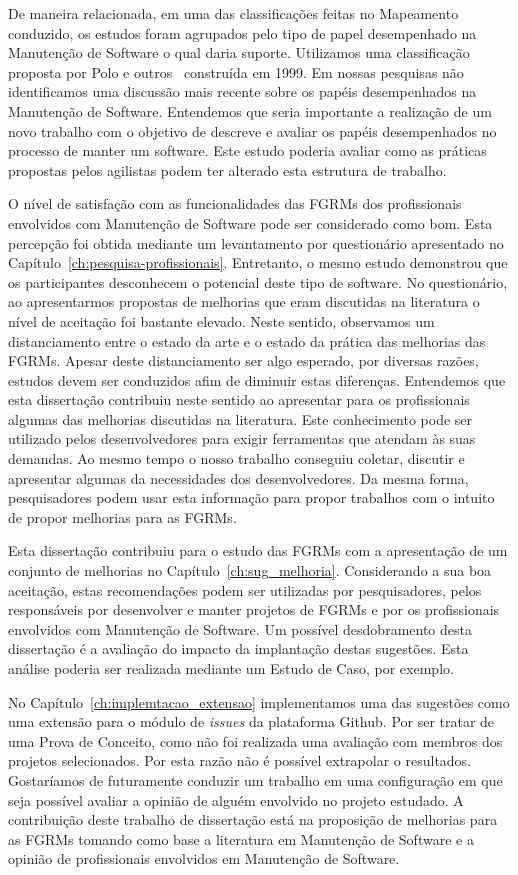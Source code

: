 De maneira relacionada, em uma das classificações feitas no Mapeamento
conduzido, os estudos foram agrupados pelo tipo de papel desempenhado na
Manutenção de Software o qual daria suporte. Utilizamos uma classificação
proposta por Polo e outros~\cite{Polo1999} construída em 1999. Em nossas
pesquisas não identificamos uma discussão mais recente sobre os papéis
desempenhados na Manutenção de Software. Entendemos que seria importante a
realização de um novo trabalho com o objetivo de descreve e avaliar os papéis
desempenhados no processo de manter um software. Este estudo poderia avaliar
como as práticas propostas pelos agilistas podem ter alterado esta estrutura de
trabalho.

O nível de satisfação com as funcionalidades das FGRMs dos profissionais
envolvidos com Manutenção de Software pode ser considerado como bom. Esta
percepção foi obtida mediante um levantamento por questionário apresentado no
Capítulo~\ref{ch:pesquisa-profissionais}. Entretanto, o mesmo estudo demonstrou
que os participantes desconhecem o potencial deste tipo de software. No
questionário, ao apresentarmos propostas de melhorias que eram discutidas na
literatura o nível de aceitação foi bastante elevado. Neste sentido, observamos
um distanciamento entre o estado da arte e o estado da prática das melhorias das
FGRMs. Apesar deste distanciamento ser algo esperado, por diversas razões,
estudos devem ser conduzidos afim de diminuir estas diferenças. Entendemos que
esta dissertação contribuiu neste sentido ao apresentar para os profissionais
algumas das melhorias discutidas na literatura. Este conhecimento pode ser
utilizado pelos desenvolvedores para exigir ferramentas que atendam às suas
demandas. Ao mesmo tempo o nosso trabalho conseguiu coletar, discutir e
apresentar algumas da necessidades dos desenvolvedores. Da mesma forma,
pesquisadores podem usar esta informação para propor trabalhos com o intuito de
propor melhorias para as FGRMs.

Esta dissertação contribuiu para o estudo das FGRMs com a apresentação de um
conjunto de melhorias no Capítulo~\ref{ch:sug_melhoria}. Considerando a sua boa
aceitação, estas recomendações podem ser utilizadas por pesquisadores, pelos
responsáveis por desenvolver e manter projetos de FGRMs e por os profissionais
envolvidos com Manutenção de Software. Um possível desdobramento desta
dissertação é a avaliação do impacto da implantação destas sugestões. Esta
análise poderia ser realizada mediante um Estudo de Caso, por exemplo.

No Capítulo~\ref{ch:implemtacao_extensao} implementamos uma das sugestões como
uma extensão para o módulo de \textit{issues} da plataforma Github. Por ser
tratar de uma Prova de Conceito, como não foi realizada uma avaliação com
membros dos projetos selecionados. Por esta razão não é possível extrapolar o
resultados.  Gostaríamos de futuramente conduzir um trabalho em uma configuração
em que seja possível avaliar a opinião de alguém envolvido no projeto estudado.
A contribuição deste trabalho de dissertação está na proposição de melhorias
para as FGRMs tomando como base a literatura em Manutenção de Software e a
opinião de profissionais envolvidos em Manutenção de Software.

